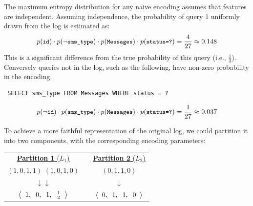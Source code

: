 \begin{example}
\label{naivemixtureencodingexample}
The maximum entropy distribution for any naive encoding assumes that features are independent.
Assuming independence, the probability of query 1 uniformly drawn from the log is estimated as: 
$$
 p(\texttt{\small id})\cdot
 p(\neg \texttt{\small sms\_type})\cdot
 p(\texttt{\small Messages})\cdot
 p(\texttt{\small status=?}) =
  \frac{4}{27} \approx 0.148
$$
This is a significant difference from the true probability of this query (i.e., $\frac{1}{3}$).  
Conversely queries not in the log, such as the following, have non-zero probability in the encoding. 
\begin{lstlisting}
 SELECT sms_type FROM Messages WHERE status = ?
\end{lstlisting}
\vspace*{-3mm}
$$
 p(\neg\texttt{\small id})\cdot
 p(\texttt{\small sms\_type})\cdot
 p(\texttt{\small Messages})\cdot
 p(\texttt{\small status=?}) =
  \frac{1}{27} \approx 0.037
$$
\end{example}

To achieve a more faithful representation of the original log, we could partition it into two components, with the corresponding encoding parameters:
\begin{center}
\begin{tabular}{cp{6mm}c}
\underline{\textbf{Partition 1} ($L_1$)} && \underline{\textbf{Partition 2} ($L_2$)} \\[1.5mm]
$(1, 0, 1, 1)$ \hspace{3mm} $(1, 0, 1, 0)$ &&  $(0, 1, 1, 0)$\\
$\downarrow$\hspace{8mm}$\downarrow$ && $\downarrow$\\
$\left<\;{\hspace{1mm}1, \hspace{2mm} 0, \hspace{2mm} 1, \hspace{2mm} \frac{1}{2}\hspace{1mm}}\;\right>$ && 
$\left<\;{\hspace{1mm}0, \hspace{2mm} 1, \hspace{2mm} 1, \hspace{2mm} 0\hspace{1mm}}\;\right>$
\end{tabular}
\end{center}

